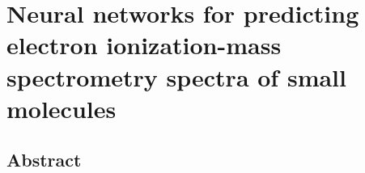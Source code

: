 \chapter{Neural networks for predicting electron ionization-mass spectrometry spectra of small molecules}\label{sec:massspec}
\thispagestyle{plain}
\vspace{-.5cm}

\section*{Abstract}
    \dsp
    


